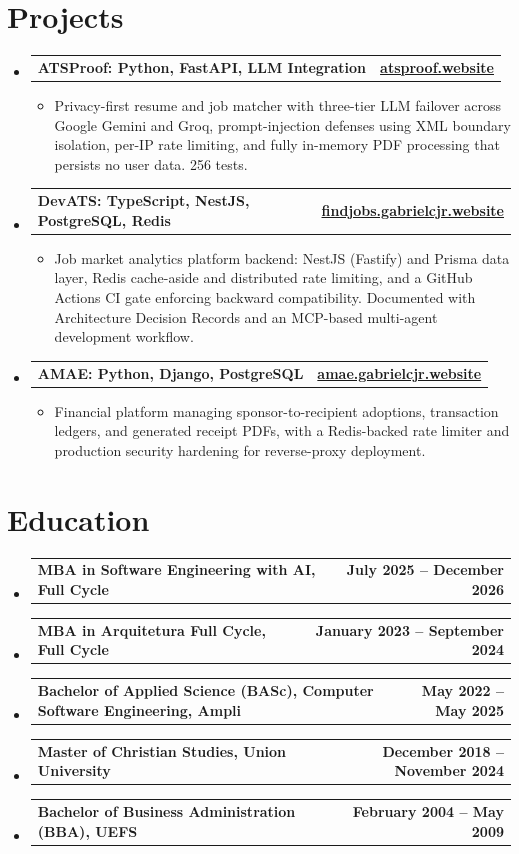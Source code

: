 \documentclass[letterpaper,10pt]{article}
\makeatletter
\newcommand{\resumeItem}[1]{
  \item\small{
    {#1 \vspace{-2pt}}
  }
}
\newcommand{\resumeProjectHeading}[2]{
    \item
    \begin{tabular*}{0.97\textwidth}{l@{\extracolsep{\fill}}r}
      \small\textbf{#1} & \textbf{#2} \\
    \end{tabular*}\vspace{-6pt}
}
\newcommand{\resumeSubHeadingListStart}{\begin{itemize}[leftmargin=0.15in, label={}]}
\newcommand{\resumeSubHeadingListEnd}{\end{itemize}}
\newcommand{\resumeItemListStart}{\begin{itemize}[leftmargin=0.15in]}
\newcommand{\resumeItemListEnd}{\end{itemize}\vspace{-5pt}}
\makeatother
\begin{document}
\section{Projects}
    \resumeSubHeadingListStart
        \resumeProjectHeading{ATSProof: Python, FastAPI, LLM Integration}{\href{https://atsproof.website}{atsproof.website}}
        \resumeItemListStart
            \resumeItem{Privacy-first resume and job matcher with three-tier LLM failover across Google Gemini and Groq, prompt-injection defenses using XML boundary isolation, per-IP rate limiting, and fully in-memory PDF processing that persists no user data. 256 tests.}
        \resumeItemListEnd

        \resumeProjectHeading{DevATS: TypeScript, NestJS, PostgreSQL, Redis}{\href{https://findjobs.gabrielcjr.website}{findjobs.gabrielcjr.website}}
        \resumeItemListStart
            \resumeItem{Job market analytics platform backend: NestJS (Fastify) and Prisma data layer, Redis cache-aside and distributed rate limiting, and a GitHub Actions CI gate enforcing backward compatibility. Documented with Architecture Decision Records and an MCP-based multi-agent development workflow.}
        \resumeItemListEnd

        \resumeProjectHeading{AMAE: Python, Django, PostgreSQL}{\href{https://amae.gabrielcjr.website}{amae.gabrielcjr.website}}
        \resumeItemListStart
            \resumeItem{Financial platform managing sponsor-to-recipient adoptions, transaction ledgers, and generated receipt PDFs, with a Redis-backed rate limiter and production security hardening for reverse-proxy deployment.}
        \resumeItemListEnd
    \resumeSubHeadingListEnd

\section{Education}
    \resumeSubHeadingListStart
        \resumeProjectHeading{MBA in Software Engineering with AI, Full Cycle}{July 2025 -- December 2026}
        \resumeProjectHeading{MBA in Arquitetura Full Cycle, Full Cycle}{January 2023 -- September 2024}
        \resumeProjectHeading{Bachelor of Applied Science (BASc), Computer Software Engineering, Ampli}{May 2022 -- May 2025}
        \resumeProjectHeading{Master of Christian Studies, Union University}{December 2018 -- November 2024}
        \resumeProjectHeading{Bachelor of Business Administration (BBA), UEFS}{February 2004 -- May 2009}
    \resumeSubHeadingListEnd
\end{document}
